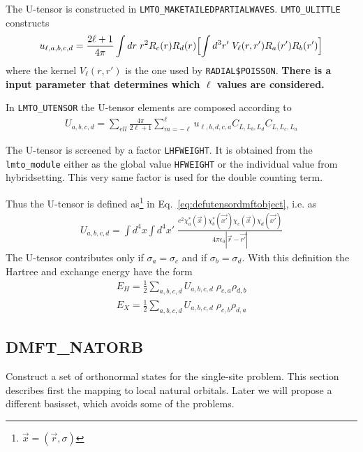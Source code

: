 \documentclass[11pt,a4paper]{report}
\begin{document}
The U-tensor is constructed in \verb|LMTO_MAKETAILEDPARTIALWAVES|.
\verb|LMTO_ULITTLE| constructs
\begin{eqnarray}
u_{\ell,a,b,c,d}
=\frac{2\ell+1}{4\pi}
\int dr\; r^2R_c(r)R_d(r)\Bigl[\int d^3r'\;V_\ell(r,r')R_a(r')R_b(r')\Bigr]
\end{eqnarray}
where the kernel $V_\ell(r,r')$ is the one used by \verb|RADIAL$POISSON|.
\textbf{There is a input parameter that determines which $\ell$ values are
considered.}

In \verb|LMTO_UTENSOR| the U-tensor elements are composed according to
\begin{eqnarray}
U_{a,b,c,d}=\sum_{ell}\frac{4\pi}{2\ell+1}\sum_{m=-\ell}^\ell
u_{\ell,b,d,c,a} C_{L,L_b,L_d}C_{L,L_c,L_a}
\end{eqnarray}

The U-tensor is screened by a factor \verb|LHFWEIGHT|. It is obtained
from the \verb|lmto_module| either as the global value \verb|HFWEIGHT|
or the individual value from hybridsetting. This very same factor is
used for the double counting term.

Thus the U-tensor is defined as\footnote{$\vec{x}=(\vec{r},\sigma)$}
in Eq.~\ref{eq:defutensordmftobject}, i.e. as
\begin{eqnarray}
U_{a,b,c,d}=\int d^4x\int d^4x'\;
\frac{e^2\chi^*_a(\vec{x})\chi^*_b(\vec{x'})\chi_c(\vec{x})\chi_d(\vec{x'})}
{4\pi\epsilon_0|\vec{r}-\vec{r'}|}
\end{eqnarray}
The U-tensor contributes only if $\sigma_a=\sigma_c$ and if
$\sigma_b=\sigma_d$.
With this definition the Hartree and exchange  energy have the form
\begin{eqnarray}
E_H=\frac{1}{2}\sum_{a,b,c,d}U_{a,b,c,d}\;\rho_{c,a}\rho_{d,b}
\nonumber\\
E_X=\frac{1}{2}\sum_{a,b,c,d}U_{a,b,c,d}\;\rho_{c,b}\rho_{d,a}
\end{eqnarray}


\subsection{DMFT\_NATORB}
\label{sec:routinedmftnatorb}
Construct a set of orthonormal states for the single-site problem.
This section describes first the mapping to local natural
orbitals. Later we will propose a different basisset, which avoids
some of the problems.
\end{document}
